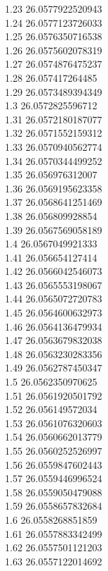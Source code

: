 {1.23	26.0577922520943\\
1.24	26.0577123726033\\
1.25	26.0576350716538\\
1.26	26.0575602078319\\
1.27	26.0574876475237\\
1.28	26.057417264485\\
1.29	26.0573489394349\\
1.3	26.0572825596712\\
1.31	26.0572180187077\\
1.32	26.0571552159312\\
1.33	26.0570940562774\\
1.34	26.0570344499252\\
1.35	26.056976312007\\
1.36	26.0569195623358\\
1.37	26.0568641251469\\
1.38	26.056809928854\\
1.39	26.0567569058189\\
1.4	26.0567049921333\\
1.41	26.056654127414\\
1.42	26.0566042546073\\
1.43	26.0565553198067\\
1.44	26.0565072720783\\
1.45	26.0564600632973\\
1.46	26.0564136479934\\
1.47	26.0563679832038\\
1.48	26.0563230283356\\
1.49	26.0562787450347\\
1.5	26.0562350970625\\
1.51	26.0561920501792\\
1.52	26.056149572034\\
1.53	26.0561076320603\\
1.54	26.0560662013779\\
1.55	26.0560252526997\\
1.56	26.0559847602443\\
1.57	26.0559446996524\\
1.58	26.0559050479088\\
1.59	26.0558657832684\\
1.6	26.0558268851859\\
1.61	26.0557883342499\\
1.62	26.0557501121203\\
1.63	26.0557122014692\\
}
